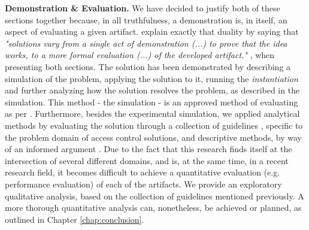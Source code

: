 \textbf{Demonstration \& Evaluation.} We have decided to justify both of these sections together because, in all truthfulness, a demonstration is, in itself, an aspect of evaluating a given artifact. \citeauthor{peffers_design_2007} \cite{peffers_design_2007} explain exactly that duality by saying that \textit{"solutions vary from a single act of demonstration (...) to prove that the idea works, to a more formal evaluation (...) of the developed artifact."} \cite[13]{peffers_design_2007}, when presenting both sections. The solution has been demonstrated by describing a simulation of the problem, applying the solution to it, running the \textit{instantiation} and further analyzing how the solution resolves the problem, as described in the simulation. This method - the simulation - is an approved method of evaluating as per \citeauthor{hevner_design_2004} \cite[13]{hevner_design_2004}. Furthermore, besides the experimental simulation, we applied analytical methods by evaluating the solution through a collection of guidelines \cite{hu_guidelines_2012}, specific to the problem domain of access control solutions, and descriptive methods, by way of an informed argument \cite[86]{peffers_design_2007}. Due to the fact that this research finds itself at the intersection of several different domains, and is, at the same time, in a recent research field, it becomes difficult to achieve a quantitative evaluation (e.g. performance evaluation) of each of the artifacts. We provide an exploratory qualitative analysis, based on the collection of guidelines mentioned previously. A more thorough quantitative analysis can, nonetheless, be achieved or planned, as outlined in Chapter \ref{chap:conclusion}.


